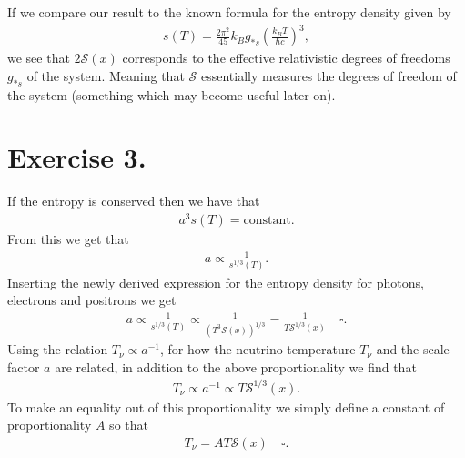 \documentclass{emulateapj}
\begin{document}
	If we compare our result to the known formula for the entropy density given by 
	\begin{align}
		s(T) = \frac{2\pi^2}{45}k_Bg_{*s}\left(\frac{k_BT}{\hbar c}\right)^3,
	\end{align}
	we see that $2\mathcal{S}(x)$ corresponds to the effective relativistic degrees of freedoms $g_{*s}$ of the system. Meaning that $\mathcal{S}$ essentially measures the degrees of freedom of the system (something which may become useful later on).
	
	\section*{Exercise 3.}
	If the entropy is conserved then we have that 
	\begin{align}
		a^3s(T) = \text{constant}.
	\end{align}
	From this we get that 
	\begin{align}
		a\propto\frac{1}{s^{1/3}(T)}.
	\end{align}
	Inserting the newly derived expression for the entropy density for photons, electrons and positrons we get
	\begin{align}
		a \propto \frac{1}{s^{1/3}(T)} \propto \frac{1}{(T^3\mathcal{S}(x))^{1/3}} = \frac{1}{T\mathcal{S}^{1/3}(x)}\quad\square.
	\end{align}
	Using the relation $T_\nu \propto a^{-1}$, for how the neutrino temperature $T_\nu$ and the scale factor $a$ are related, in addition to the above proportionality we find that 
	\begin{align}
		T_\nu \propto a^{-1} \propto T\mathcal{S}^{1/3}(x).
	\end{align}
	To make an equality out of this proportionality we simply define a constant of proportionality $A$ so that 
	\begin{align}
		T_\nu = AT\mathcal{S}(x)\quad\square.
	\end{align}
	
\end{document}
